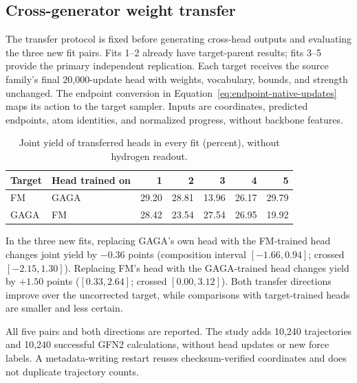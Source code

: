 \subsection{Cross-generator weight transfer}\label{app:cross-head}
The transfer protocol is fixed before generating cross-head outputs and evaluating the three new fit pairs. Fits 1--2 already have target-parent results; fits 3--5 provide the primary independent replication. Each target receives the source family's final 20,000-update head with weights, vocabulary, bounds, and strength unchanged. The endpoint conversion in Equation~\ref{eq:endpoint-native-updates} maps its action to the target sampler. Inputs are coordinates, predicted endpoints, atom identities, and normalized progress, without backbone features.

\begin{table}[htbp]\centering\small\caption{Joint yield of transferred heads in every fit (percent), without hydrogen readout.}\begin{tabular}{llrrrrr}\toprule Target & Head trained on & 1 & 2 & 3 & 4 & 5\\\midrule
FM & GAGA & 29.20 & 28.81 & 13.96 & 26.17 & 29.79\\
GAGA & FM & 28.42 & 23.54 & 27.54 & 26.95 & 19.92\\
\bottomrule\end{tabular}\end{table}

In the three new fits, replacing GAGA's own head with the FM-trained head changes joint yield by $-0.36$ points (composition interval $[-1.66,0.94]$; crossed $[-2.15,1.30]$). Replacing FM's head with the GAGA-trained head changes yield by $+1.50$ points ($[0.33,2.64]$; crossed $[0.00,3.12]$). Both transfer directions improve over the uncorrected target, while comparisons with target-trained heads are smaller and less certain.

All five pairs and both directions are reported. The study adds 10,240 trajectories and 10,240 successful GFN2 calculations, without head updates or new force labels. A metadata-writing restart reuses checksum-verified coordinates and does not duplicate trajectory counts.
